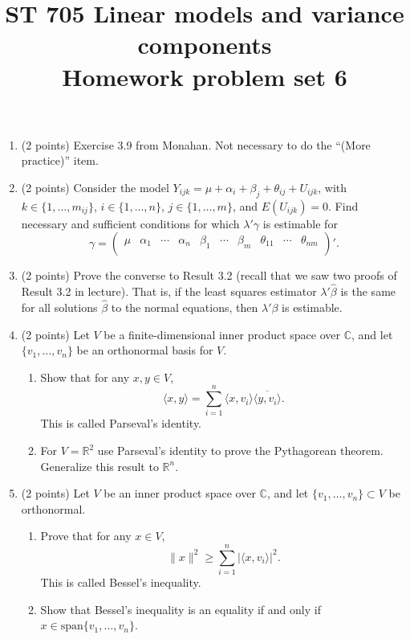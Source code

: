 \documentclass[11pt]{article}
\title{ST 705 Linear models and variance components \\ 
        Homework problem set 6}
\begin{document}
\maketitle

\begin{enumerate}

\item(2 points) Exercise 3.9 from Monahan.  Not necessary to do the ``(More practice)'' item. 

\item(2 points) Consider the model $Y_{ijk} = \mu + \alpha_{i} + \beta_{j} + \theta_{ij} + U_{ijk}$, with $k \in \{1,\dots,m_{ij}\}$, $i \in \{1,\dots,n\}$, $j \in \{1,\dots,m\}$, and $E(U_{ijk}) = 0$.  Find necessary and sufficient conditions for which $\lambda'\gamma$ is estimable for 
\[
\gamma =
\begin{pmatrix}
\mu & \alpha_{1} & \cdots & \alpha_{n} & \beta_{1} & \cdots & \beta_{m} & \theta_{11} & \cdots & \theta_{nm} \\
\end{pmatrix}'.
\]

\item(2 points) Prove the converse to Result 3.2 (recall that we saw two proofs of Result 3.2 in lecture).  That is, if the least squares estimator $\lambda'\widehat{\beta}$ is the same for all solutions $\widehat{\beta}$ to the normal equations, then $\lambda'\beta$ is estimable. 

\item(2 points) Let $V$ be a finite-dimensional inner product space over $\mathbb{C}$, and let $\{v_{1},\dots,v_{n}\}$ be an orthonormal basis for $V$.  
\begin{enumerate}
\item Show that for any $x,y \in V$,
\[
\langle x,y\rangle = \sum_{i=1}^{n}\langle x,v_{i} \rangle\overline{\langle y,v_{i} \rangle}.
\]
This is called Parseval's identity.
\item For $V = \mathbb{R}^{2}$ use Parseval's identity to prove the Pythagorean theorem.  Generalize this result to $\mathbb{R}^{n}$.
\end{enumerate}

\item(2 points) Let $V$ be an inner product space over $\mathbb{C}$, and let $\{v_{1},\dots,v_{n}\} \subset V$ be orthonormal.
\begin{enumerate}
\item Prove that for any $x \in V$,
\[
\|x\|^{2} \ge \sum_{i=1}^{n} |\langle x,v_{i}\rangle|^{2}.
\]
This is called Bessel's inequality.
\item Show that Bessel's inequality is an equality if and only if $x \in \text{span}\{v_{1},\dots,v_{n}\}$.
\end{enumerate}  

\end{enumerate}
\end{document}
